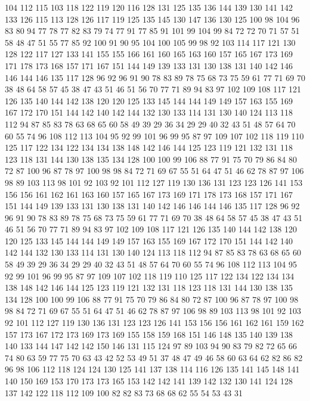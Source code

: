 104 112 115 103 118 122 119 120 116 128 131 125 135 136 144 139 130 141 142 133
126 115 113 128 126 117 119 125 135 145 130 147 136 130 125 100 98 104 96 83
80 94 77 78 77 82 83 79 74 77 91 77 85 91 101 99 104 99 84 72
72 70 71 57 51 58 48 47 51 55 77 85 92 100 91 90 95 104 100 105
99 98 92 103 114 117 121 130 128 122 117 127 133 141 155 155 166 161 160 165
163 160 157 165 167 173 169 171 178 173 168 157 171 167 151 144 149 139 133 131
130 138 131 140 142 146 146 144 146 135 117 128 96 92 96 91 90 78 83 89
78 75 68 73 75 59 61 77 71 69 70 38 48 64 58 57 45 38 47 43
51 46 51 56 70 77 71 89 94 83 97 102 109 108 117 121 126 135 140 144
142 138 120 120 125 133 145 144 144 149 149 157 163 155 169 167 172 170 151 144
142 140 142 144 132 130 133 114 131 130 140 124 113 118 112 94 87 85 83 78
63 68 65 60 58 49 39 29 36 34 29 29 40 32 43 51 48 57 64 70
60 55 74 96 108 112 113 104 95 92 99 101 96 99 95 87 97 109 107 102
118 119 110 125 117 122 134 122 134 134 138 148 142 146 144 125 123 119 121 132
131 118 123 118 131 144 130 138 135 134 128 100 100 99 106 88 77 91 75 70
79 86 84 80 72 87 100 96 87 78 97 100 98 98 84 72 71 69 67 55
51 64 47 51 46 62 78 87 97 106 98 89 103 113 98 101 92 103 92 101
112 127 119 130 136 131 123 123 126 141 153 156 156 161 162 161 163 160 157 165
167 173 169 171 178 173 168 157 171 167 151 144 149 139 133 131 130 138 131 140
142 146 146 144 146 135 117 128 96 92 96 91 90 78 83 89 78 75 68 73
75 59 61 77 71 69 70 38 48 64 58 57 45 38 47 43 51 46 51 56
70 77 71 89 94 83 97 102 109 108 117 121 126 135 140 144 142 138 120 120
125 133 145 144 144 149 149 157 163 155 169 167 172 170 151 144 142 140 142 144
132 130 133 114 131 130 140 124 113 118 112 94 87 85 83 78 63 68 65 60
58 49 39 29 36 34 29 29 40 32 43 51 48 57 64 70 60 55 74 96
108 112 113 104 95 92 99 101 96 99 95 87 97 109 107 102 118 119 110 125
117 122 134 122 134 134 138 148 142 146 144 125 123 119 121 132 131 118 123 118
131 144 130 138 135 134 128 100 100 99 106 88 77 91 75 70 79 86 84 80
72 87 100 96 87 78 97 100 98 98 84 72 71 69 67 55 51 64 47 51
46 62 78 87 97 106 98 89 103 113 98 101 92 103 92 101 112 127 119 130
136 131 123 123 126 141 153 156 156 161 162 161 159 162 157 173 167 172 173 169
173 169 155 158 159 168 151 146 148 135 140 139 138 140 133 144 147 142 142 150
146 131 115 124 97 89 103 94 90 83 79 82 72 65 66 74 80 63 59 77
75 70 63 43 42 52 53 49 51 37 48 47 49 46 58 60 63 64 62 82
86 82 96 98 106 112 118 124 124 130 125 141 137 138 114 116 126 135 141 145
148 141 140 150 169 153 170 173 173 165 153 142 142 141 139 142 132 130 141 124
128 137 142 122 118 112 109 100 82 82 83 73 68 68 62 55 54 53 43 31
